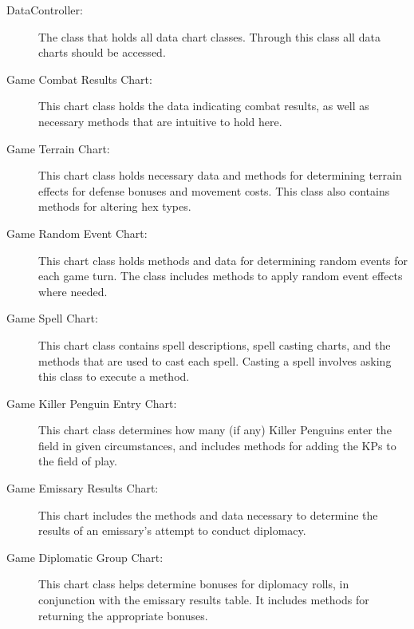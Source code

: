 \documentclass[11pt]{article}
\begin{document}
\begin{description}
\item[DataController:] The class that holds all data chart classes. Through this class all data charts should be accessed.
\item[Game Combat Results Chart:] This chart class holds the data indicating combat results, as well as necessary methods that are intuitive to hold here.
\item[Game Terrain Chart:] This chart class holds necessary data and methods for determining terrain effects for defense bonuses and movement costs. This class also contains methods for altering hex types.
\item[Game Random Event Chart:] This chart class holds methods and data for determining random events for each game turn. The class includes methods to apply random event effects where needed.
\item[Game Spell Chart:] This chart class contains spell descriptions, spell casting charts, and the methods that are used to cast each spell. Casting a spell involves asking this class to execute a method.
\item[Game Killer Penguin Entry Chart:] This chart class determines how many (if any) Killer Penguins enter the field in given circumstances, and includes methods for adding the KPs to the field of play.
\item[Game Emissary Results Chart:] This chart includes the methods and data necessary to determine the results of an emissary's attempt to conduct diplomacy.
\item[Game Diplomatic Group Chart:] This chart class helps determine bonuses for diplomacy rolls, in conjunction with the emissary results table. It includes methods for returning the appropriate bonuses.
\end{description}
\end{document}
